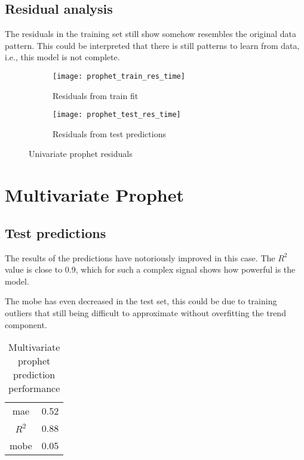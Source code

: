 \subsection{Residual analysis}

The residuals in the training set still show somehow resembles the original data pattern. This could be interpreted that there is still patterns to learn from data, i.e., this model is not complete. 

\begin{figure}[hptb]
	\centering
	\begin{subfigure}{.8\textwidth}
		\texttt{[image: prophet\_train\_res\_time]}
		\caption{Residuals from train fit}
		\label{fig:prophet_train_res_time}
	\end{subfigure}%
	\hfill
	\begin{subfigure}{.8\textwidth}
		\texttt{[image: prophet\_test\_res\_time]}
		\caption{Residuals from test predictions}
		\label{fig:prophet_test_res_time}
	\end{subfigure}
	\caption{Univariate prophet residuals}
	\label{fig:prophet_res_time}
\end{figure}






\section{Multivariate Prophet}

\subsection{Test predictions}

The results of the predictions have notoriously improved in this case. The $R^2$ value is close to 0.9, which for such a complex signal shows how powerful is the model. 

The \ac{mobe} has even decreased in the test set, this could be due to training outliers that still being difficult to approximate without overfitting the trend component. 


\begin{table}[H]
	\centering
	\begin{tabular}{|c|c|}
		\hline
		\ac{mae} 	& 0.52 \\
		$R^2$ 		& 0.88 \\
		\ac{mobe} 	& 0.05 \\
		\hline
	\end{tabular}
	\caption{Multivariate prophet prediction performance}
	\label{table:prophet_multi_test_scores}
\end{table}



